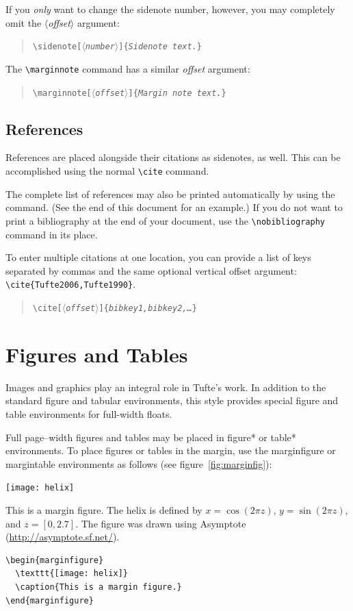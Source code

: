 \documentclass{tufte-handout}
\newcommand{\doccmd}[1]{\texttt{\textbackslash#1}}%
\newcommand{\docopt}[1]{\ensuremath{\langle}\textrm{\textit{#1}}\ensuremath{\rangle}}%
\newcommand{\docarg}[1]{\textrm{\textit{#1}}}%
\newcommand{\docenv}[1]{\textsf{#1}}%
\newenvironment{docspec}{\begin{quote}\noindent}{\end{quote}}%
\begin{document}
If you \emph{only} want to change the sidenote number, however, you may
completely omit the \docopt{offset} argument:
\begin{docspec}
  \doccmd{sidenote[\docopt{number}]\{\docarg{Sidenote text.}\}}
\end{docspec}

The \Verb|\marginnote| command has a similar \docarg{offset} argument:
\begin{docspec}
  \doccmd{marginnote[\docopt{offset}]\{\docarg{Margin note text.}\}}
\end{docspec}

\subsection{References}
References are placed alongside their citations as sidenotes,
as well.  This can be accomplished using the normal \Verb|\cite|
command.

The complete list of references may also be printed automatically by using
the \Verb|| command.  (See the end of this document for an
example.)  If you do not want to print a bibliography at the end of your
document, use the \Verb|\nobibliography| command in its place.  

To enter multiple citations at one location,\cite{Tufte2006,Tufte1990} you can
provide a list of keys separated by commas and the same optional vertical
offset argument: \Verb|\cite{Tufte2006,Tufte1990}|.  
\begin{docspec}
  \doccmd{cite[\docopt{offset}]\{\docarg{bibkey1,bibkey2,\ldots}\}}
\end{docspec}

\section{Figures and Tables}\label{sec:figures-and-tables}
Images and graphics play an integral role in Tufte's work.
In addition to the standard \docenv{figure} and \docenv{tabular} environments,
this style provides special figure and table environments for full-width
floats.

Full page--width figures and tables may be placed in \docenv{figure*} or
\docenv{table*} environments.  To place figures or tables in the margin,
use the \docenv{marginfigure} or \docenv{margintable} environments as follows
(see figure~\ref{fig:marginfig}):

\begin{marginfigure}%
  \texttt{[image: helix]}
  \caption{This is a margin figure.  The helix is defined by 
    $x = \cos(2\pi z)$, $y = \sin(2\pi z)$, and $z = [0, 2.7]$.  The figure was
    drawn using Asymptote (\url{http://asymptote.sf.net/}).}
  \label{fig:marginfig}
\end{marginfigure}
\begin{Verbatim}
\begin{marginfigure}
  \texttt{[image: helix]}
  \caption{This is a margin figure.}
\end{marginfigure}
\end{Verbatim}
\end{document}
